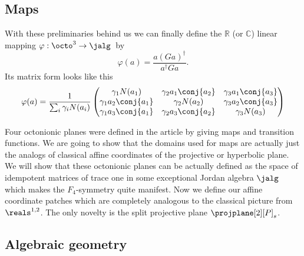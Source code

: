 \subsection{Maps}

With these preliminaries behind us we can finally define the $\mathbb{R}$ (or $\mathbb{C}$) linear mapping $\varphi: \octo^3 \to \jalg $\ by
\[
	\varphi(a) = \frac{a(Ga)^\dagger}{a^\dagger Ga}.
\]
Its matrix form looks like this
\begin{equation}\label{eq:varphi}
\varphi(a) = \frac{1}{\sum\nolimits_i\gamma_i N(a_i)} 
	\begin{pmatrix}
		\gamma_1 N(a_1) & \gamma_2 a_1 \conj{a_2} & \gamma_3 a_1 \conj{a_3} \\
		\gamma_1 a_2\conj{a_1} & \gamma_2 N(a_2)  & \gamma_3 a_2 \conj{a_3} \\
		\gamma_1 a_3\conj{a_1} & \gamma_2 a_3 \conj{a_2} & \gamma_3 N(a_3) \\
	\end{pmatrix}
\end{equation}

Four octonionic planes were defined in the article \cite{held_semi-riemannian_2009} by giving maps and transition functions. We are going to show that the domains used for maps are actually just the analogs of classical affine coordinates of the projective or hyperbolic plane. We will show that these octonionic planes can be actually defined as the space of idempotent matrices of trace one in some exceptional Jordan algebra $\jalg$ which makes the $F_4$-symmetry quite manifest. Now we define our affine coordinate patches which are completely analogous to the classical picture from $\reals^{1,2}$. The only novelty is the split projective plane $\projplane[2][P]_s$.


\subsection{Algebraic geometry}

